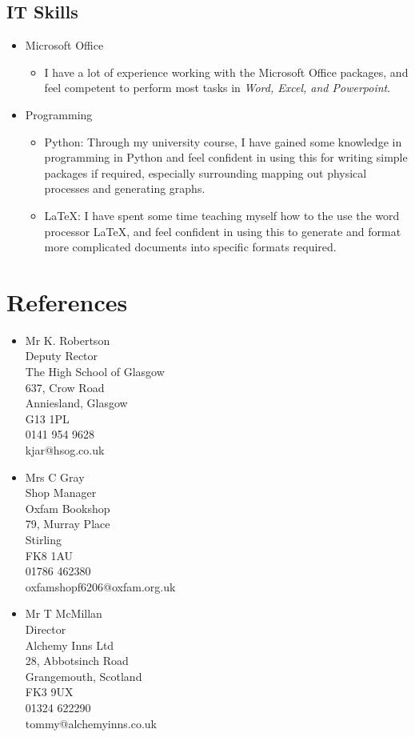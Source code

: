 \documentclass[10pt, a4paper]{article}
\begin{document}
	\subsection{IT Skills}
	\begin{itemize}
		\item Microsoft Office
		\begin{itemize}
			\item I have a lot of experience working with the Microsoft Office packages, and feel competent to perform most tasks in \textit{Word, Excel, and Powerpoint}.
		\end{itemize}
		\item Programming
		\begin{itemize}
			\item Python: Through my university course, I have gained some knowledge in programming in Python and feel confident in using this for writing simple packages if required, especially surrounding mapping out physical processes and generating graphs.
			\item \LaTeX: I have spent some time teaching myself how to the use the word processor \LaTeX, and feel confident in using this to generate and format more complicated documents into specific formats required.
		\end{itemize}
	\end{itemize}
\section{References}
	\begin{multicols*}{2}
		\begin{itemize}
			\item Mr K. Robertson \\ Deputy Rector \\ The High School of Glasgow \\ 637, Crow Road	\\ Anniesland, Glasgow	\\ G13 1PL \\ 0141 954 9628	\\ kjar@hsog.co.uk
			\item Mrs C Gray \\ Shop Manager \\ Oxfam Bookshop \\ 79, Murray Place \\ Stirling \\ FK8 1AU \\ 01786 462380 \\ oxfamshopf6206@oxfam.org.uk
			\item Mr T McMillan \\ Director \\ Alchemy Inns Ltd \\ 28, Abbotsinch Road \\ Grangemouth, Scotland \\ FK3 9UX \\ 01324 622290 \\tommy@alchemyinns.co.uk
		\end{itemize}
	\end{multicols*}
\end{document}

